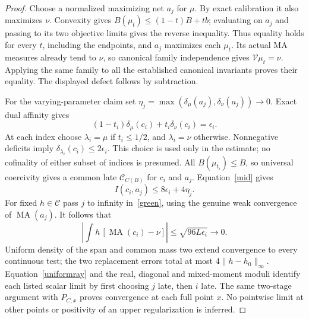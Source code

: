 \documentclass[11pt]{article}
\newcommand{\C}{\mathcal C}
\newcommand{\MA}{\operatorname{MA}}
\newcommand{\V}{\mathcal V}
\begin{document}
\begin{proof}
Choose a normalized maximizing net $a_j$ for $\mu$. By exact
calibration it also maximizes $\nu$. Convexity gives
$B(\mu_t)\le(1-t)B+tb$; evaluating on $a_j$ and passing to its
two objective limits gives the reverse inequality. Thus equality holds
for every $t$, including the endpoints, and $a_j$ maximizes each
$\mu_t$. Its actual MA measures already tend to $\nu$, so canonical
family independence gives $\V\mu_t=\nu$. Applying the same family
to all the established canonical invariants proves their equality.
The displayed defect follows by subtraction.

For the varying-parameter claim set
$\eta_j=\max(\delta_\mu(a_j),\delta_\nu(a_j))\to0$. Exact dual
affinity gives
\[
 (1-t_i)\delta_\mu(c_i)+t_i\delta_\nu(c_i)=\epsilon_i.
\]
At each index choose $\lambda_i=\mu$ if $t_i\le1/2$, and
$\lambda_i=\nu$ otherwise. Nonnegative deficits imply
$\delta_{\lambda_i}(c_i)\le2\epsilon_i$. This choice is used only
in the estimate; no cofinality of either subset of indices is presumed.
All $B(\mu_{t_i})\le B$, so universal coercivity gives a common
late $\C_{C(B)}$ for $c_i$ and $a_j$. Equation~\eqref{mid} gives
\begin{equation}\label{uniformray}
 I(c_i,a_j)\le8\epsilon_i+4\eta_j.
\end{equation}
For fixed $h\in\C$ pass $j$ to infinity in~\eqref{green}, using
the genuine weak convergence of $\MA(a_j)$. It follows that
\[
 \left|\int h\,[\MA(c_i)-\nu]\right|
       \le\sqrt{96L\epsilon_i}\longrightarrow0.
\]
Uniform density of the span and common mass two extend convergence
to every continuous test; the two replacement errors total at most
$4\|h-h_0\|_\infty$. Equation~\eqref{uniformray} and the real,
diagonal and mixed-moment moduli identify each listed scalar limit
by first choosing $j$ late, then $i$ late. The same two-stage argument
with $P_{C,x}$ proves convergence at each full point $x$.
No pointwise limit at other points or positivity of an upper
regularization is inferred.
\end{proof}
\end{document}
